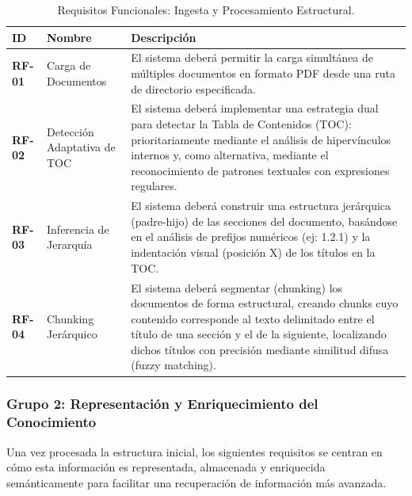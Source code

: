 \begin{table}[H]
\centering
\renewcommand{\arraystretch}{1.4} %
\caption{Requisitos Funcionales: Ingesta y Procesamiento Estructural.}
\label{tab:rf_ingesta}
\begin{tabularx}{\textwidth}{|l|l|X|}
\hline
\textbf{ID} & \textbf{Nombre} & \textbf{Descripción} \\
\hline
\textbf{RF-01} & Carga de Documentos & El sistema deberá permitir la carga simultánea de múltiples documentos en formato PDF desde una ruta de directorio especificada. \\
\hline
\textbf{RF-02} & Detección Adaptativa de TOC & El sistema deberá implementar una estrategia dual para detectar la Tabla de Contenidos (TOC): prioritariamente mediante el análisis de hipervínculos internos y, como alternativa, mediante el reconocimiento de patrones textuales con expresiones regulares. \\
\hline
\textbf{RF-03} & Inferencia de Jerarquía & El sistema deberá construir una estructura jerárquica (padre-hijo) de las secciones del documento, basándose en el análisis de prefijos numéricos (ej: 1.2.1) y la indentación visual (posición X) de los títulos en la TOC. \\
\hline
\textbf{RF-04} & Chunking Jerárquico & El sistema deberá segmentar (chunking) los documentos de forma estructural, creando chunks cuyo contenido corresponde al texto delimitado entre el título de una sección y el de la siguiente, localizando dichos títulos con precisión mediante similitud difusa (fuzzy matching). \\
\hline
\end{tabularx}
\end{table}

\newpage
\subsubsection*{Grupo 2: Representación y Enriquecimiento del Conocimiento}
Una vez procesada la estructura inicial, los siguientes requisitos se centran en cómo esta información es representada, almacenada y enriquecida semánticamente para facilitar una recuperación de información más avanzada.

